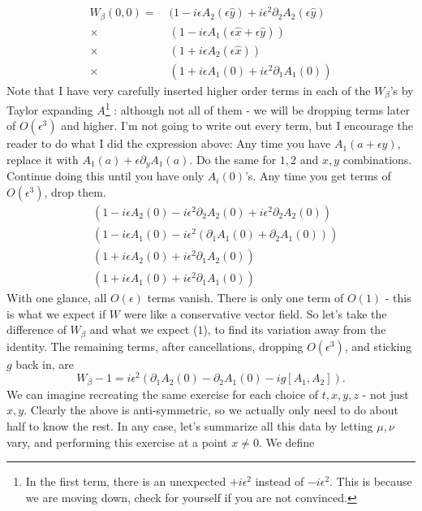 \documentclass[main.tex]{subfiles}
\begin{document}
\begin{align*}
W_\beta (0,0) = & \; (1 - i \epsilon A_2 (\epsilon \hat{y}) +i \epsilon^2 \partial_2 A_2 (\epsilon \hat{y}) \\
\times & \; (1 - i \epsilon A_1 (\epsilon \hat{x} + \epsilon \hat{y})) \\
\times & \; (1 + i \epsilon A_2 (\epsilon \hat{x})) \\
\times & \; (1 + i \epsilon A_1 (0) + i \epsilon^2 \partial_1 A_1 (0))
\end{align*}
Note that I have very carefully inserted higher order terms in each of the $W_\beta$'s by Taylor expanding $A$\footnote{In the first term, there is an unexpected $+i\epsilon^2$ instead of $-i\epsilon^2$. This is because we are moving down, check for yourself if you are not convinced.} : although not all of them - we will be dropping terms later of $O(\epsilon^3)$ and higher. I'm not going to write out every term, but I encourage the reader to do what I did the expression above: Any time you have $A_1 (a + \epsilon \hat{y})$, replace it with $A_1 (a) + \epsilon \partial_y A_1(a)$. Do the same for $1,2$ and $x,y$ combinations. Continue doing this until you have only $A_i (0)$'s. Any time you get terms of $O(\epsilon^3)$, drop them.
\begin{align*} 
& \left(
1 - i \epsilon A_2 (0) - i \epsilon^2 \partial_2 A_2 (0) + i \epsilon^2 \partial_2 A_2 (0)
\right) \\
& \left(
1 - i \epsilon A_1 (0) - i \epsilon^2 (\partial_1 A_1 (0) + \partial_2 A_1 (0))
\right) \\
& \left(
1 + i \epsilon A_2 (0) + i \epsilon^2 \partial_1 A_2 (0)
\right) \\
& \left( 
1 + i \epsilon A_1 (0) + i \epsilon^2 \partial_1 A_1 (0)
\right)
\end{align*}
With one glance, all $O(\epsilon)$ terms vanish. There is only one term of $O(1)$ - this is what we expect if $W$ were like a conservative vector field. So let's take the difference of $W_\beta$ and what we expect ($1$), to find its variation away from the identity. The remaining terms, after cancellations, dropping $O(\epsilon^3)$, and sticking $g$ back in, are
\begin{equation} \label{thegoods}
W_\beta - 1 = i \epsilon^2 \left( \partial_1 A_2 (0) - \partial_2 A_1 (0) - i g [A_1, A_2]
\right).
\end{equation}
We can imagine recreating the same exercise for each choice of $t,x,y,z$ - not just $x,y$. Clearly the above is anti-symmetric, so we actually only need to do about half to know the rest. In any case, let's summarize all this data by letting $\mu,\nu$ vary, and performing this exercise at a point $x \neq 0$. We define
\end{document}
